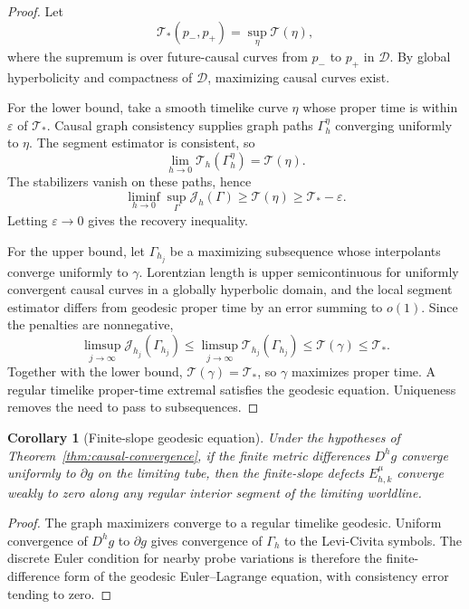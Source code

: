 \documentclass[11pt]{article}
\newtheorem{corollary}[definition]{Corollary}
\newcommand{\D}{\mathcal D}
\newcommand{\J}{\mathcal J}
\newcommand{\T}{\mathcal T}
\begin{document}
\begin{proof}
Let
\[
        \T_*(p_-,p_+)
        =
        \sup_{\eta}\T(\eta),
\]
where the supremum is over future-causal curves from \(p_-\) to \(p_+\) in
\(\D\).  By global hyperbolicity and compactness of \(\D\), maximizing causal
curves exist.

For the lower bound, take a smooth timelike curve \(\eta\) whose proper time is
within \(\varepsilon\) of \(\T_*\).  Causal graph consistency supplies graph
paths \(\Gamma_h^\eta\) converging uniformly to \(\eta\).  The segment
estimator is consistent, so
\[
        \lim_{h\to0}\T_h(\Gamma_h^\eta)=\T(\eta).
\]
The stabilizers vanish on these paths, hence
\[
        \liminf_{h\to0}\sup_{\Gamma}\J_h(\Gamma)
        \ge \T(\eta)
        \ge \T_*-\varepsilon.
\]
Letting \(\varepsilon\to0\) gives the recovery inequality.

For the upper bound, let \(\Gamma_{h_j}\) be a maximizing subsequence whose
interpolants converge uniformly to \(\gamma\).  Lorentzian length is upper
semicontinuous for uniformly convergent causal curves in a globally hyperbolic
domain, and the local segment estimator differs from geodesic proper time by
an error summing to \(o(1)\).  Since the penalties are nonnegative,
\[
        \limsup_{j\to\infty}\J_{h_j}(\Gamma_{h_j})
        \le
        \limsup_{j\to\infty}\T_{h_j}(\Gamma_{h_j})
        \le
        \T(\gamma)
        \le
        \T_*.
\]
Together with the lower bound, \(\T(\gamma)=\T_*\), so \(\gamma\) maximizes
proper time.  A regular timelike proper-time extremal satisfies the geodesic
equation.  Uniqueness removes the need to pass to subsequences.
\end{proof}

\begin{corollary}[Finite-slope geodesic equation]\label{cor:finite-slope}
Under the hypotheses of Theorem~\ref{thm:causal-convergence}, if the finite
metric differences \(D^h g\) converge uniformly to \(\partial g\) on the
limiting tube, then the finite-slope defects \(E^\mu_{h,k}\) converge weakly to
zero along any regular interior segment of the limiting worldline.
\end{corollary}

\begin{proof}
The graph maximizers converge to a regular timelike geodesic.  Uniform
convergence of \(D^h g\) to \(\partial g\) gives convergence of
\(\Gamma_h\) to the Levi-Civita symbols.  The discrete Euler condition for
nearby probe variations is therefore the finite-difference form of the
geodesic Euler--Lagrange equation, with consistency error tending to zero.
\end{proof}
\end{document}
